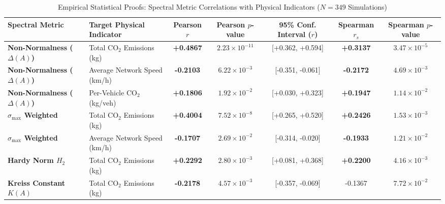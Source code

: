 \documentclass[lettersize,journal]{IEEEtran}
\begin{document}
\begin{table}[t]
\caption{Empirical Statistical Proofs: Spectral Metric Correlations with Physical Indicators ($N = 349$ Simulations)}
\label{tab:spectral_correlations}
\centering
\begin{tabular}{llccccc}
\toprule
Spectral Metric & Target Physical Indicator & Pearson $r$ & Pearson $p$-value & 95\% Conf. Interval ($r$) & Spearman $r_s$ & Spearman $p$-value \\
\midrule
\textbf{Non-Normalness ($\Delta(A)$)} & Total $\text{CO}_2$ Emissions (kg) & \textbf{+0.4867} & \textbf{$2.23 \times 10^{-11}$} & [+0.362, +0.594] & \textbf{+0.3137} & \textbf{$3.47 \times 10^{-5}$} \\
\textbf{Non-Normalness ($\Delta(A)$)} & Average Network Speed (km/h) & \textbf{-0.2103} & \textbf{$6.22 \times 10^{-3}$} & [-0.351, -0.061] & \textbf{-0.2172} & \textbf{$4.69 \times 10^{-3}$} \\
\textbf{Non-Normalness ($\Delta(A)$)} & Per-Vehicle $\text{CO}_2$ (kg/veh) & \textbf{+0.1806} & \textbf{$1.92 \times 10^{-2}$} & [+0.030, +0.323] & \textbf{+0.1947} & \textbf{$1.14 \times 10^{-2}$} \\
\textbf{$\sigma_{\max}$ Weighted} & Total $\text{CO}_2$ Emissions (kg) & \textbf{+0.4004} & \textbf{$7.52 \times 10^{-8}$} & [+0.265, +0.520] & \textbf{+0.2426} & \textbf{$1.53 \times 10^{-3}$} \\
\textbf{$\sigma_{\max}$ Weighted} & Average Network Speed (km/h) & \textbf{-0.1707} & \textbf{$2.69 \times 10^{-2}$} & [-0.314, -0.020] & \textbf{-0.1933} & \textbf{$1.21 \times 10^{-2}$} \\
\textbf{Hardy Norm $H_2$} & Total $\text{CO}_2$ Emissions (kg) & \textbf{+0.2292} & \textbf{$2.80 \times 10^{-3}$} & [+0.081, +0.368] & \textbf{+0.2200} & \textbf{$4.16 \times 10^{-3}$} \\
\textbf{Kreiss Constant $K(A)$} & Total $\text{CO}_2$ Emissions (kg) & \textbf{-0.2178} & \textbf{$4.57 \times 10^{-3}$} & [-0.357, -0.069] & -0.1367 & $7.72 \times 10^{-2}$ \\
\bottomrule
\end{tabular}
\end{table}
\end{document}
